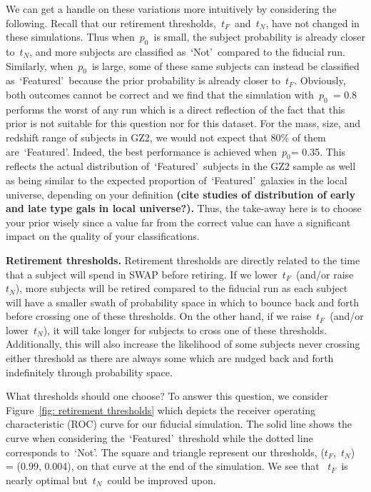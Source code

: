 \documentclass[twocolumn]{aastex6}
\newcommand{\p}{$p_0$}
\newcommand{\tf}{$t_F$}
\newcommand{\tn}{$t_N$}
\newcommand{\feat}{`Featured'}
\newcommand{\notfeat}{`Not'}
\begin{document}
We can get a handle on these variations more intuitively by considering the following.
Recall that our retirement thresholds,~\tf~and~\tn, have not changed in these simulations. 
Thus when~\p~is small, the subject probability is already closer to~\tn, and more 
subjects are classified as~\notfeat~compared to the fiducial run.
Similarly, when~\p~is large, some of these same subjects can instead be classified
as~\feat~because the prior probability is already closer to~\tf. Obviously, both 
outcomes cannot be correct and we find that the simulation with~\p~= 0.8 performs
the worst of any run which is a direct reflection of the fact that this prior is not 
suitable for this question nor for this dataset. For the mass, size, and redshift range
of subjects in GZ2, we would not expect that 80\% of them are~\feat. Indeed, 
the best performance is achieved when~\p = 0.35.  This reflects the actual 
distribution of~\feat~subjects in the GZ2 sample as well as being similar to the 
expected proportion of~\feat~galaxies in the local universe, depending on your
definition\textbf{ (cite studies of distribution of early and late type gals in local universe?). }
Thus, the take-away here is to choose your prior wisely since a value far from the correct
value can have a significant impact on the quality of your classifications.
 


\textbf{Retirement thresholds.}
Retirement thresholds are directly related to the time that a subject will spend
in SWAP before retiring.  If we lower~\tf~(and/or raise~\tn), more subjects will be retired
compared to the fiducial run as each subject will have a smaller swath of probability space
in which to bounce back and forth before crossing one of these thresholds.
On the other hand, if we raise~\tf~(and/or lower~\tn), it will take longer for subjects
to cross one of these thresholds. Additionally, this will also increase the likelihood of
some subjects never crossing either threshold as there are always some 
which are nudged back and forth indefinitely through probability space.


What thresholds should one choose? To answer this question, we consider
Figure~\ref{fig: retirement thresholds} which depicts the receiver operating 
characteristic (ROC) curve for our fiducial simulation. The solid line shows the 
curve when considering the~\feat~threshold  while the dotted line
corresponds to~\notfeat. The square and triangle represent our thresholds, 
(\tf,~\tn) = (0.99, 0.004), on that curve at the end of the simulation.  We see that 
~\tf~is nearly optimal but~\tn~could be improved upon. 
\end{document}
